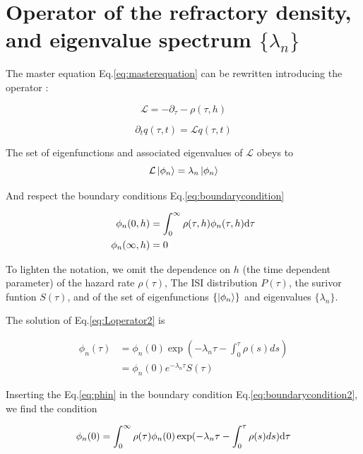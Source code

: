 \documentclass[a4paper,11pt,twoside]{article}
\def \dd  {{\rm d}}
\numberwithin{equation}{section}
\begin{document}
\section{Operator of the refractory density, and eigenvalue spectrum $\{\lambda_n\}$}

The master equation Eq.\eqref{eq:masterequation} can be rewritten introducing the operator :

\begin{equation}
\label{eq:Loperator}
\mathcal{L}=-\partial_\tau-\rho(\tau,h)
\end{equation}

\begin{equation}
\label{eq:masterequation2}
\partial_t q(\tau,t)=\mathcal{L}q(\tau,t)
\end{equation}

The set of eigenfunctions and associated eigenvalues of $\mathcal{L}$ obeys to
\begin{equation}
\label{eq:Loperator2}
\mathcal{L}\ket{\phi_n}=\lambda_n\ket{\phi_n}
\end{equation}

And respect the boundary conditions Eq.\eqref{eq:boundarycondition}

\begin{align}
\label{eq:boundarycondition2}
\phi_n(0,h)&=\int_0^\infty\rho(\tau,h)\phi_n(\tau,h)\dd\tau\\
\phi_n(\infty,h)&=0\\
\end{align}


 To lighten the notation, we omit the dependence on $h$ (the time dependent parameter) of the hazard rate $\rho(\tau)$, The ISI distribution $P(\tau)$, the surivor funtion $S(\tau)$, and of the set of eigenfunctions $\{\ket{\phi_n}\}$ and eigenvalues $\{\lambda_n\}$.

The solution of Eq.\eqref{eq:Loperator2} is

\begin{align}
\label{eq:phin}
\phi_n(\tau)&=\phi_n(0)\exp(-\lambda_n\tau-\int_0^\tau\rho(s)ds)\nonumber\\
&=\phi_n(0)e^{-\lambda_n\tau}S(\tau)
\end{align}

Inserting the Eq.\eqref{eq:phin} in the boundary condition Eq.\eqref{eq:boundarycondition2}, we find the condition

\begin{equation}
\label{eq:condition1}
\phi_n(0)=\int_0^\infty\rho(\tau)\phi_n(0)\exp(-\lambda_n\tau-\int_0^\tau\rho(s)ds)\dd\tau
\end{equation}
\end{document}

